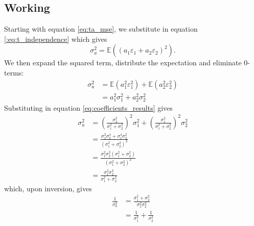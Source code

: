 \subsection{Working}
\label{sub:analysis:working}

Starting with equation \ref{eq:ta_mse}, we substitute in equation \ref{:eq:t_independence} which gives
\begin{equation*}
    \sigma_a^2 = \mathbb{E} \left( \left( a_1 \varepsilon_1 + a_2 \varepsilon_2 \right)^2 \right).
\end{equation*}
We then expand the squared term, distribute the expectation and eliminate $0$-terms:
\begin{align*}
    \sigma_a^2 &= \mathbb{E} \left( a_1^2 \varepsilon_1^2 \right) + \mathbb{E} \left( a_2^2 \varepsilon_2^2 \right) \\
                &= a_1^2 \sigma_1^2 + a_2^2 \sigma_2^2
\end{align*}
Substituting in equation \ref{eq:coefficients_results} gives
\begin{align*}
    \sigma_a^2 &= \left( \frac{\sigma_2^2}{\sigma_1^2 + \sigma_2^2} \right)^2 \sigma_1^2 + \left( \frac{\sigma_1^2}{\sigma_1^2 + \sigma_2^2} \right)^2 \sigma_2^2 \\
                &= \frac{\sigma_1^2 \sigma_2^4 + \sigma_1^4 \sigma_2^2}{\left( \sigma_1^2 + \sigma_2^2 \right)^2} \\
                &= \frac{\sigma_1^2 \sigma_2^2 \left(\sigma_1^2 + \sigma_2^2 \right)}{\left(\sigma_1^2 + \sigma_2^2 \right)^2} \\
                &= \frac{\sigma_1^2 \sigma_2^2}{\sigma_1^2 + \sigma_2^2}
\end{align*}
which, upon inversion, gives
\begin{align}
    \frac{1}{\sigma_a^2} &= \frac{\sigma_1^2 + \sigma_2^2}{\sigma_1^2 \sigma_2^2} \nonumber \\
                            &= \frac{1}{\sigma_1^2} + \frac{1}{\sigma_2^2}
\end{align}
